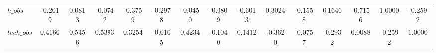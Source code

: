 \begin{center}
\begin{longtable}{lcccccccccccccc}
$h\_obs         $	 & 	          -0.2019	 & 	           0.0813	 & 	          -0.0742	 & 	          -0.3759	 & 	          -0.2978	 & 	          -0.0450	 & 	          -0.0809	 & 	          -0.6013	 & 	           0.3024	 & 	          -0.1558	 & 	           0.1646	 & 	          -0.7156	 & 	           1.0000	 & 	          -0.2592 \\ 
$tech\_obs      $	 & 	           0.4166	 & 	           0.5456	 & 	           0.5393	 & 	           0.3254	 & 	          -0.0165	 & 	           0.4234	 & 	          -0.1040	 & 	           0.1412	 & 	          -0.3620	 & 	          -0.0757	 & 	          -0.2932	 & 	           0.0088	 & 	          -0.2592	 & 	           1.0000 \\ 
\end{longtable}
 \end{center}

